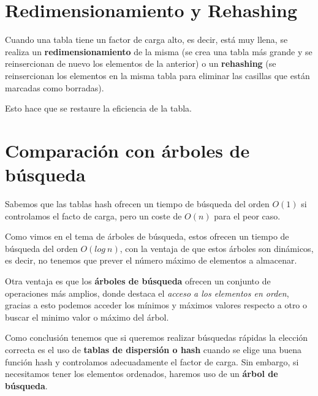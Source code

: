 \section{Redimensionamiento y Rehashing}
Cuando una tabla tiene un factor de carga alto, es decir, está muy llena, se realiza un \textbf{redimensionamiento} de la misma (se crea una tabla más grande y se reinsercionan de nuevo los elementos de la anterior) o un \textbf{rehashing} (se reinsercionan los elementos en la misma tabla para eliminar las casillas que están marcadas como borradas).

Esto hace que se restaure la eficiencia de la tabla.

\section{Comparación con árboles de búsqueda}
Sabemos que las tablas hash ofrecen un tiempo de búsqueda del orden \(O(1)\) si controlamos el facto de carga, pero un coste de \(O(n)\) para el peor caso.

Como vimos en el tema de árboles de búsqueda, estos ofrecen un tiempo de búsqueda del orden \(O(log\ n)\), con la ventaja de que estos árboles son dinámicos, es decir, no tenemos que prever el número máximo de elementos a almacenar.

Otra ventaja es que los \textbf{árboles de búsqueda} ofrecen un conjunto de operaciones más amplios, donde destaca el \textit{acceso a los elementos en orden}, gracias a esto podemos acceder los mínimos y máximos valores respecto a otro o buscar el minimo valor o máximo del árbol.

Como conclusión tenemos que si queremos realizar búsquedas rápidas la elección correcta es el uso de \textbf{tablas de dispersión o hash} cuando se elige una buena función hash y controlamos adecuadamente el factor de carga. Sin embargo, si necesitamos tener los elementos ordenados, haremos uso de un \textbf{árbol de búsqueda}.